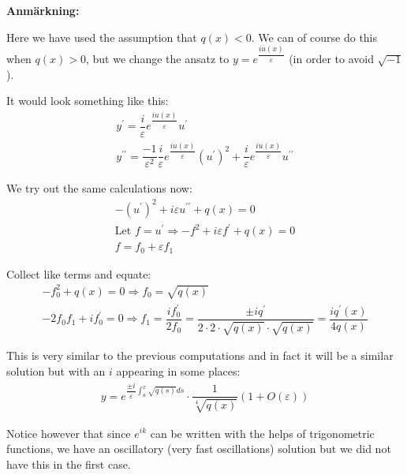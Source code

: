 \par\bigskip
\noindent\textbf{Anmärkning:}\par
\noindent Here we have used the assumption that $q(x)<0$. We can of course do this when $q(x)>0$, but we change the ansatz to $y=e^{\dfrac{iu(x)}{\varepsilon}}$ (in order to avoid $\sqrt{-1}$).\par
\noindent It would look something like this:
\begin{equation*}
  \begin{gathered}
    y^{\prime} = \dfrac{i}{\varepsilon}e^{\dfrac{iu(x)}{\varepsilon}}u^{\prime}\\
    y^{\prime\prime} = \dfrac{-1}{\varepsilon^2}\dfrac{i}{\varepsilon}e^{\dfrac{iu(x)}{\varepsilon}}(u^{\prime})^2+\dfrac{i}{\varepsilon}e^{\dfrac{iu(x)}{\varepsilon}}u^{\prime\prime}
  \end{gathered}
\end{equation*}
\par\bigskip
\noindent We try out the same calculations now:
\begin{equation*}
  \begin{gathered}
    -(u^{\prime})^2+i\varepsilon u^{\prime\prime} + q(x) = 0\\
    \text{Let } f=u^{\prime}\Rightarrow -f^2+i\varepsilon f^{\prime}+q(x) = 0\\
    f = f_0+\varepsilon f_1
  \end{gathered}
\end{equation*}\par
\noindent Collect like terms and equate:
\begin{equation*}
  \begin{gathered}
    -f_0^2+q(x) = 0\Rightarrow f_0 = \sqrt{q(x)}\\
    -2f_0f_1+if_0^{\prime}=0\Rightarrow f_1=\dfrac{if_0^{\prime}}{2f_0} = \dfrac{\pm iq^{\prime}}{2\cdot2\cdot\sqrt{q(x)}\cdot\sqrt{q(x)}} = \dfrac{iq^{\prime}(x)}{4q(x)}
  \end{gathered}
\end{equation*}
\par\bigskip
\noindent This is very similar to the previous computations and in fact it will be a similar solution but with an $i$ appearing in some places:
\begin{equation*}
  \begin{gathered}
    y = e^{\dfrac{\pm i}{\varepsilon}\int_{a}^{x}\sqrt{q(s)}ds}\cdot\dfrac{1}{\sqrt[4]{q(x)}}(1+O(\varepsilon))
  \end{gathered}
\end{equation*}
\par\bigskip
\noindent Notice however that since $e^{ik}$ can be written with the helps of trigonometric functions, we have an oscillatory (very fast oscillations) solution but we did not have this in the first case. 
\par\bigskip
